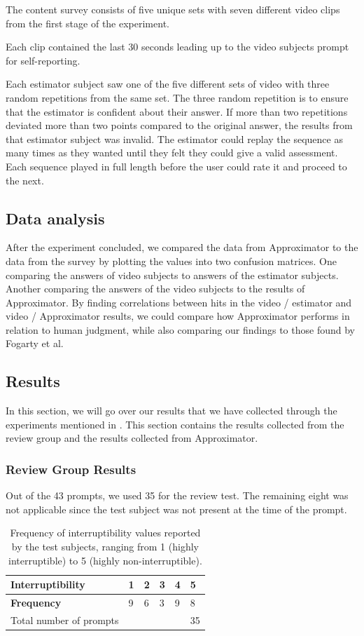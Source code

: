 \documentclass{sigchi}
\begin{document}
The content survey consists of five unique sets with seven different video clips from the first stage of the experiment.

Each clip contained the last 30 seconds leading up to the video subjects prompt for self-reporting.

Each estimator subject saw one of the five different sets of video with three random repetitions from the same set.
The three random repetition is to ensure that the estimator is confident about their answer.
If more than two repetitions deviated more than two points compared to the original answer, the results from that estimator subject was invalid.
The estimator could replay the sequence as many times as they wanted until they felt they could give a valid assessment.
Each sequence played in full length before the user could rate it and proceed to the next.

\subsection{Data analysis}
After the experiment concluded, we compared the data from Approximator to the data from the survey by plotting the values into two confusion matrices.
One comparing the answers of video subjects to answers of the estimator subjects.
Another comparing the answers of the video subjects to the results of Approximator.
By finding correlations between hits in the video / estimator and video / Approximator results, we could compare how Approximator performs in relation to human judgment, while also comparing our findings to those found by Fogarty et al. \cite{fogarty2005predicting}

\subsection{Results}
In this section, we will go over our results that we have collected through the experiments mentioned in .
This section contains the results collected from the review group and the results collected from Approximator.

\subsubsection{Review Group Results}
Out of the 43 prompts, we used 35 for the review test.
The remaining eight was not applicable since the test subject was not present at the time of the prompt.

\begin{table}[h]
  \centering
    \begin{tabular}{@{}llllll@{}}
    \toprule
    \textbf{Interruptibility} & 1 & 2 & 3 & 4 & 5  \\ \midrule
    \textbf{Frequency}        & 9 & 6 & 3 & 9 & 8  \\ \midrule
    Total number of prompts   &   &   &   &   & 35
    \end{tabular}
    \caption{Frequency of interruptibility values reported by the test subjects, ranging from 1 (highly interruptible) to 5 (highly non-interruptible).}
    \label{fig:interruptibilityFrequency}
\end{table}
\end{document}
